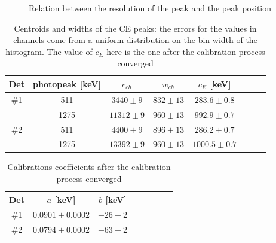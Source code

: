 \documentclass[11pt,a4 paper]{article}
\begin{document}
\begin{figure}
  \centering
   \quad
  \caption{Relation between the resolution of the peak and the peak position}
  \label{fig:sim}
\end{figure}




\begin{table}[H]
  \centering
  \begin{tabular}{cccccccc}
    \toprule
    Det & photopeak [keV] & $c_{ch}$ & $w_{ch}$ & $c_E$ [keV] \\
    \midrule
    \#1 & 511 & $3440 \pm 9$ & $832 \pm 13$ & $283.6 \pm 0.8$ \\
        & 1275 & $11312 \pm 9$ & $960 \pm 13$ & $992.9 \pm 0.7$ \\
    \#2 & 511 & $4400 \pm 9$ & $896 \pm 13$ & $286.2 \pm 0.7$ \\
        & 1275 & $13392 \pm 9$ & $960 \pm 13$ & $1000.5 \pm 0.7$ \\
    \bottomrule
  \end{tabular}
  \caption{Centroids and widths of the CE peaks: the errors for the values in channels come from a uniform distribution on the bin width of the histogram.
  The value of $c_E$ here is the one after the calibration process converged}
  \label{tab:calibr:fits}
\end{table}

\begin{table}[H]
  \centering
  \begin{tabular}{cccccccc}
    \toprule
    Det & $a$ [keV] & $b$ [keV] \\
    \midrule
    \#1 & $0.0901 \pm 0.0002$ & $-26 \pm 2$ \\
    \#2 & $0.0794 \pm 0.0002$ & $-63 \pm 2$ \\
    \bottomrule
  \end{tabular}
  \caption{Calibrations coefficients after the calibration process converged}
  \label{tab:calibr:coeffs}
\end{table}
\end{document}
